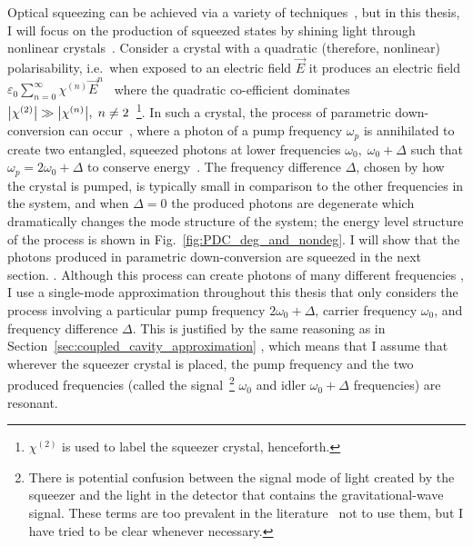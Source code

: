 Optical squeezing can be achieved via a variety of techniques~\cite{}, but in this thesis, I will focus on the production of squeezed states by shining light through nonlinear crystals~\cite{}. Consider a crystal with a quadratic (therefore, nonlinear) polarisability, i.e.\ when exposed to an electric field $\vec E$ it produces an electric field $\varepsilon_0 \sum_{n=0}^\infty \chi^{(n)} {\vec E}^n$~\cite{ ref in Kirk thesis?}  where the quadratic co-efficient dominates $\abs{\chi^{(2)}}\gg\abs{\chi^{(n)}},\; n\neq2$~\footnote{$\chi^{(2)}$ is used to label the squeezer crystal, henceforth.}. In such a crystal, the process of parametric down-conversion can occur~\cite{}, where a photon of a  pump frequency $\omega_p$ is annihilated to create two entangled, squeezed photons at lower frequencies $\omega_0,\; \omega_0+\Delta$ such that $\omega_p=2\omega_0+\Delta$ to conserve energy~\cite{}. The frequency difference $\Delta$, chosen by how the crystal is pumped, is typically small in comparison to the other frequencies in the system, and when $\Delta=0$ the produced photons are degenerate which dramatically changes the mode structure of the system; the energy level structure of the process is shown in Fig.~\ref{fig:PDC_deg_and_nondeg}. I will show that the photons produced in parametric down-conversion are squeezed in the next section. %
. Although this process can create photons of many different frequencies , I use a single-mode approximation throughout this thesis that only considers the process involving a particular pump frequency $2\omega_0+\Delta$, carrier frequency $\omega_0$, and frequency difference $\Delta$. This is justified by the same reasoning as in Section~\ref{sec:coupled_cavity_approximation} , %
which means that I assume that wherever the squeezer crystal is placed, the pump frequency and the two produced frequencies (called the signal~\footnote{There is potential confusion between the signal mode of light created by the squeezer and the light in the detector that contains the gravitational-wave signal. %
These terms are too prevalent in the literature~\cite{} not to use them, but I have tried to be clear whenever necessary.} $\omega_0$ and idler $\omega_0+\Delta$ frequencies) are resonant.

